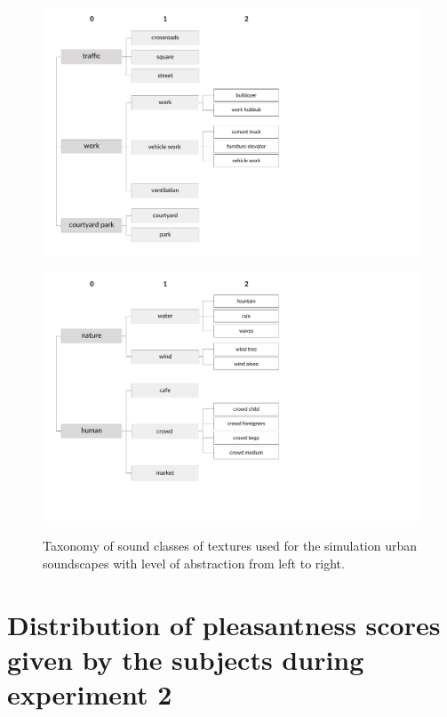 \documentclass[12pt]{elsarticle}
\begin{document}
\begin{figure}[hp]
  \centering
        {\includegraphics[trim={ 0 0 7cm 0},clip,width=.7\columnwidth]{gfx/appendix/texture_1_en}\label{fig:taxonomieTexturea}} \par

        {\includegraphics[trim={ 0 0 7cm 1cm},clip,width=.7\columnwidth]{gfx/appendix/texture_2_en}\label{fig:taxonomieTextureb}}
       \caption{Taxonomy of sound classes of textures used for the simulation urban soundscapes with level of abstraction from left to right.}
       \label{fig:taxonomieT}
\end{figure}

\newpage
\section{Distribution of pleasantness scores given by the subjects during experiment 2}
\label{app:xp2}
\end{document}
